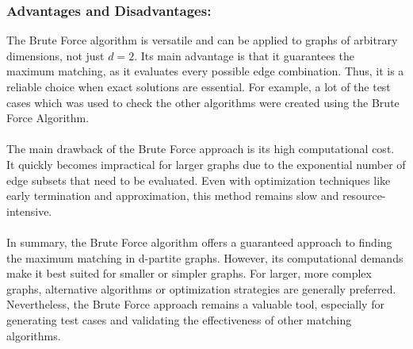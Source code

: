 \subsubsection*{Advantages and Disadvantages:}
The Brute Force algorithm is versatile and can be applied to graphs of arbitrary dimensions, not just \( d = 2 \). Its main advantage is that it guarantees the maximum matching, as it evaluates every possible edge combination. Thus, it is a reliable choice when exact solutions are essential. For example, a lot of the test cases which was used to check the other algorithms were created using the Brute Force Algorithm. \\
\\
The main drawback of the Brute Force approach is its high computational cost. It quickly becomes impractical for larger graphs due to the exponential number of edge subsets that need to be evaluated. Even with optimization techniques like early termination and approximation, this method remains slow and resource-intensive.\\
\\
In summary, the Brute Force algorithm offers a guaranteed approach to finding the maximum matching in d-partite graphs. However, its computational demands make it best suited for smaller or simpler graphs. For larger, more complex graphs, alternative algorithms or optimization strategies are generally preferred. Nevertheless, the Brute Force approach remains a valuable tool, especially for generating test cases and validating the effectiveness of other matching algorithms.